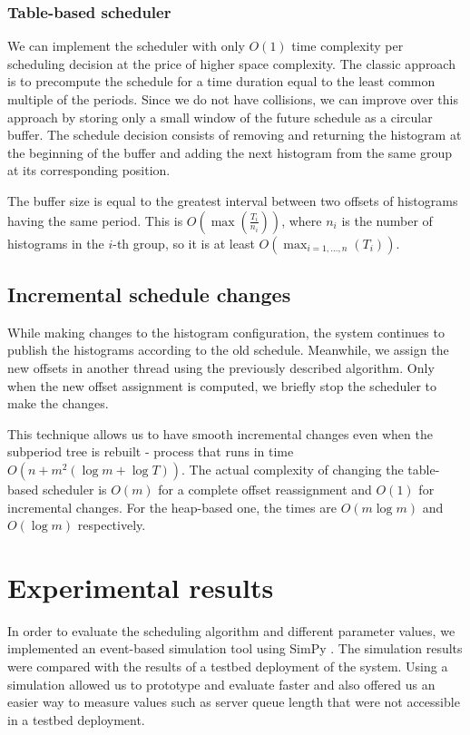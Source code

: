 \subsubsection*{Table-based scheduler}

We can implement the scheduler with only $O(1)$ time complexity per scheduling decision at the price of higher space complexity. The classic approach is to precompute the schedule for a time duration equal to the least common multiple of the periods. Since we do not have collisions, we can improve over this approach by storing only a small window of the future schedule as a circular buffer. The schedule decision consists of removing and returning the histogram at the beginning of the buffer and adding the next histogram from the same group at its corresponding position.
 
The buffer size is equal to the greatest interval between two offsets of histograms having the same period. This is  $O\left(\max\left(\frac {T_i}  {n_i}\right)\right)$, where $n_i$ is the number of histograms in the $i$-th group, so it is at least $O(\max_{i=1,\ldots,n}(T_i))$.

\subsection*{Incremental schedule changes}

While making changes to the histogram configuration, the system continues to publish the histograms according to the old schedule. Meanwhile, we assign the new offsets in another thread using the previously described algorithm. Only when the new offset assignment is computed, we briefly stop the scheduler to make the changes.

This technique allows us to have smooth incremental changes even when the subperiod tree is rebuilt - process that runs in time $O(n+m^2(\log m+\log T))$. The actual complexity of changing the table-based scheduler is $O(m)$ for a complete offset reassignment and $O(1)$ for incremental changes. For the heap-based one, the times are $O(m\log m)$ and $O(\log m)$ respectively.






\section{Experimental results}

In order to evaluate the scheduling algorithm and different parameter values, we implemented an event-based simulation tool using SimPy \citep{simpy}. The simulation results were compared with the results of a testbed deployment of the system. Using a simulation allowed us to prototype and evaluate faster and also offered us an easier way to measure values such as server queue length that were not accessible in a testbed deployment.

